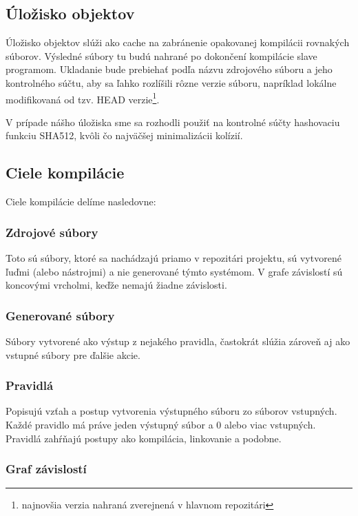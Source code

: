 \subsection{\'{U}lo\v{z}isko objektov}
\label{sub:solution:storage}
Úložisko objektov slúži ako cache na zabránenie opakovanej kompilácii rovnakých
súborov. Výsledné súbory tu budú nahrané po dokončení kompilácie slave programom.
Ukladanie bude prebiehať podľa názvu zdrojového súboru a jeho kontrolného súčtu,
aby sa ľahko rozlíšili rôzne verzie súboru, napríklad lokálne modifikovaná od
tzv. HEAD verzie\footnote{najnovšia verzia nahraná zverejnená v hlavnom repozitári}.

V prípade nášho úložiska sme sa rozhodli použiť na kontrolné súčty hashovaciu funkciu
SHA512, kvôli čo najväčšej minimalizácii kolízií.

\subsection{Ciele kompil\'{a}cie}
\label{sub:solution:targets}
Ciele kompilácie delíme nasledovne:

\subsubsection{Zdrojové súbory}
Toto sú súbory, ktoré sa nachádzajú priamo v repozitári projektu, sú vytvorené
ľuďmi (alebo nástrojmi) a nie generované týmto systémom. V grafe závislostí sú
koncovými vrcholmi, keďže nemajú žiadne závislosti.

\subsubsection{Generované súbory}
Súbory vytvorené ako výstup z nejakého pravidla, častokrát slúžia zároveň aj ako
vstupné súbory pre ďalšie akcie.

\subsubsection{Pravidlá}
Popisujú vzťah a postup vytvorenia výstupného súboru zo súborov vstupných.
Každé pravidlo má práve jeden výstupný súbor a 0 alebo viac vstupných. Pravidlá
zahŕňajú postupy ako kompilácia, linkovanie a podobne.

\subsubsection{Graf závislostí}

